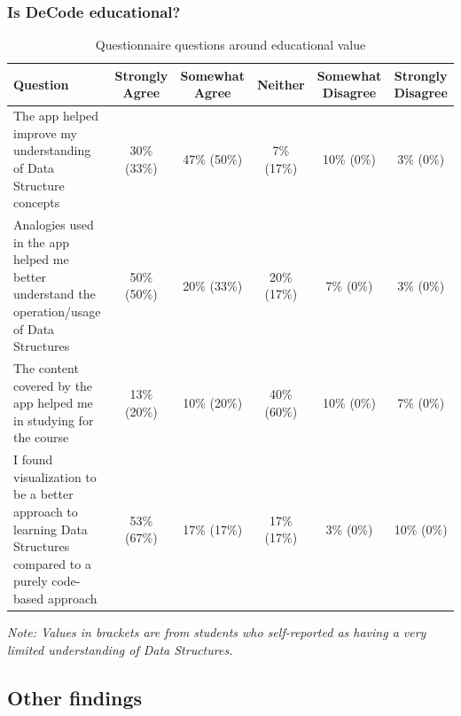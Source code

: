 \documentclass[10pt]{article}
\begin{document}
\subsubsection{Is DeCode educational?}
\begin{table}[]
  \begin{tabulary}{\linewidth}{|L|C|C|C|C|C|}
  \hline
  \textbf{Question}                                                                                                  & \textbf{Strongly Agree} & \textbf{Somewhat Agree} & \textbf{Neither} & \textbf{Somewhat Disagree} & \textbf{Strongly Disagree} \\ \hline
  The app helped improve my understanding of Data Structure concepts                                                 & 30\% (33\%)             & 47\% (50\%)             & 7\% (17\%)       & 10\% (0\%)                 & 3\% (0\%)                  \\ \hline
  Analogies used in the app helped me better understand the operation/usage of Data Structures                       & 50\% (50\%)             & 20\% (33\%)             & 20\% (17\%)      & 7\% (0\%)                  & 3\% (0\%)                  \\ \hline
  The content covered by the app helped me in studying for the course                                                & 13\% (20\%)             & 10\% (20\%)             & 40\% (60\%)      & 10\% (0\%)                 & 7\% (0\%)                  \\ \hline
  I found visualization to be a better approach to learning Data Structures compared to a purely code-based approach & 53\% (67\%)             & 17\% (17\%)             & 17\% (17\%)      & 3\% (0\%)                  & 10\% (0\%)                 \\ \hline
  \end{tabulary}
  \emph{Note: Values in brackets are from students who self-reported as having a very limited understanding of Data Structures.}
  \caption{Questionnaire questions around educational value}
  \label{tab:edutable}
\end{table}
\subsection{Other findings}
\end{document}
